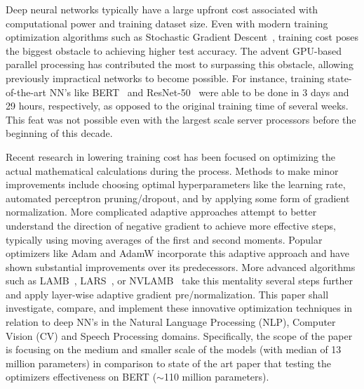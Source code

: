 Deep neural networks typically have a large upfront cost associated with computational power and training dataset size. Even with modern training optimization algorithms such as Stochastic Gradient Descent~\cite{SGD}, training cost poses the biggest obstacle to achieving higher test accuracy. The advent GPU-based parallel processing has contributed the most to surpassing this obstacle, allowing previously impractical networks to become possible. For instance, training state-of-the-art NN's like BERT~\cite{bert} and ResNet-50~\cite{resnet} were able to be done in 3 days and 29 hours, respectively, as opposed to the original training time of several weeks. This feat was not possible even with the largest scale server processors before the beginning of this decade. 

Recent research in lowering training cost has been focused on optimizing the actual mathematical calculations during the process. Methods to make minor improvements include choosing optimal hyperparameters like the learning rate, automated perceptron pruning/dropout\cite{autopercept}, and by applying some form of gradient normalization. More complicated adaptive approaches attempt to better understand the direction of negative gradient to achieve more effective steps, typically using moving averages of the first and second moments. Popular optimizers like Adam and AdamW incorporate this adaptive approach and have shown substantial improvements over its predecessors\cite{Loshchilov2017FixingWD}. More advanced algorithms such as LAMB~\cite{You2020Large}, LARS~\cite{qian2020impact, ginsburg2018large}, or NVLAMB~\cite{nvidia_nvlamb}  take this mentality several steps further and apply layer-wise adaptive gradient pre/normalization. This paper shall investigate, compare, and implement these innovative optimization techniques in relation to deep NN's in the Natural Language Processing (NLP), Computer Vision (CV) and Speech Processing domains. Specifically, the scope of the paper is focusing on the medium and smaller scale of the models (with median of 13 million parameters) in comparison to state of the art paper that testing the optimizers effectiveness on BERT ($\sim$110 million parameters). 


